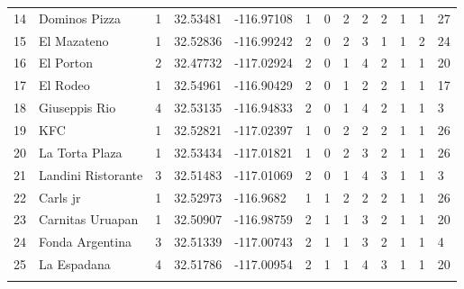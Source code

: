 \begin{table}
\begin{tabular}{lllllllllllll}
14  &   Dominos Pizza   &   1   &   32.53481    &   -116.97108  &   1   &   0   &   2   &   2   &   2   &   1   &   1   &   27  \\
15  &   El Mazateno &   1   &   32.52836    &   -116.99242  &   2   &   0   &   2   &   3   &   1   &   1   &   2   &   24  \\
16  &   El Porton   &   2   &   32.47732    &   -117.02924  &   2   &   0   &   1   &   4   &   2   &   1   &   1   &   20  \\
17  &   El Rodeo    &   1   &   32.54961    &   -116.90429  &   2   &   0   &   1   &   2   &   2   &   1   &   1   &   17  \\
18  &   Giuseppis Rio   &   4   &   32.53135    &   -116.94833  &   2   &   0   &   1   &   4   &   2   &   1   &   1   &   3   \\
19  &   KFC     &   1   &   32.52821    &   -117.02397  &   1   &   0   &   2   &   2   &   2   &   1   &   1   &   26  \\
20  &   La Torta Plaza  &   1   &   32.53434    &   -117.01821  &   1   &   0   &   2   &   3   &   2   &   1   &   1   &   26  \\
21  &   Landini Ristorante  &   3  &   32.51483   &   -117.01069  &   2   &   0   &   1   &   4   &   3   &   1   &   1   &   3   \\
22  &   Carls jr    &   1   &   32.52973    &   -116.9682   &   1   &   1   &   2   &   2   &   2   &   1   &   1   &   26  \\
23  &   Carnitas Uruapan  &   1   &   32.50907  &   -116.98759  &   2   &   1   &   1   &   3   &   2   &   1   &   1   &   20  \\
24  &   Fonda Argentina &   3   &   32.51339    &   -117.00743  &   2   &   1   &   1   &   3   &   2   &   1   &   1   &   4   \\
25  &   La Espadana &   4   &   32.51786    &   -117.00954  &   2   &   1   &   1   &   4   &   3   &   1   &   1   &   20  \\
\noalign{\smallskip}\hline
\end{tabular}
\end{table}

